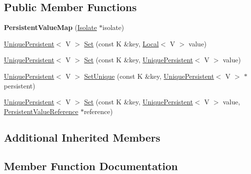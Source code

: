\subsection*{Public Member Functions}
\begin{DoxyCompactItemize}
\item 
\hypertarget{classv8_1_1_persistent_value_map_af8000a75ef84fa719724dc4dadc1e5ee}{}{\bfseries Persistent\+Value\+Map} (\hyperlink{classv8_1_1_isolate}{Isolate} $\ast$isolate)\label{classv8_1_1_persistent_value_map_af8000a75ef84fa719724dc4dadc1e5ee}

\item 
\hyperlink{classv8_1_1_unique_persistent}{Unique\+Persistent}$<$ V $>$ \hyperlink{classv8_1_1_persistent_value_map_af1b5e39f5d0275d8d58d787de5a181d9}{Set} (const K \&key, \hyperlink{classv8_1_1_local}{Local}$<$ V $>$ value)
\item 
\hyperlink{classv8_1_1_unique_persistent}{Unique\+Persistent}$<$ V $>$ \hyperlink{classv8_1_1_persistent_value_map_a31f69108cbb1b481ca5112c22c274681}{Set} (const K \&key, \hyperlink{classv8_1_1_unique_persistent}{Unique\+Persistent}$<$ V $>$ value)
\item 
\hyperlink{classv8_1_1_unique_persistent}{Unique\+Persistent}$<$ V $>$ \hyperlink{classv8_1_1_persistent_value_map_ad145a27f7433da2e79c53325047a1303}{Set\+Unique} (const K \&key, \hyperlink{classv8_1_1_unique_persistent}{Unique\+Persistent}$<$ V $>$ $\ast$persistent)
\item 
\hyperlink{classv8_1_1_unique_persistent}{Unique\+Persistent}$<$ V $>$ \hyperlink{classv8_1_1_persistent_value_map_a4a6ea22cb9a1adbf52e14f92e6370693}{Set} (const K \&key, \hyperlink{classv8_1_1_unique_persistent}{Unique\+Persistent}$<$ V $>$ value, \hyperlink{classv8_1_1_persistent_value_map_base_1_1_persistent_value_reference}{Persistent\+Value\+Reference} $\ast$reference)
\end{DoxyCompactItemize}
\subsection*{Additional Inherited Members}


\subsection{Member Function Documentation}
\hypertarget{classv8_1_1_persistent_value_map_af1b5e39f5d0275d8d58d787de5a181d9}{}
